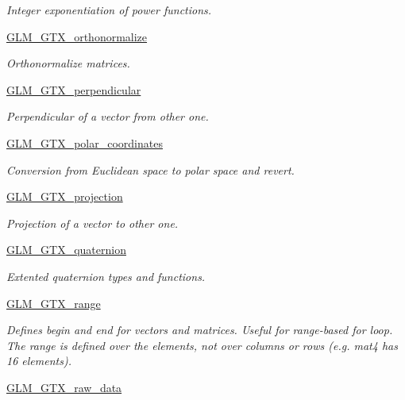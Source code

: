\begin{DoxyCompactItemize}
\begin{DoxyCompactList}\small\item\em Integer exponentiation of power functions. \end{DoxyCompactList}\item 
\mbox{\hyperlink{group__gtx__orthonormalize}{G\+L\+M\+\_\+\+G\+T\+X\+\_\+orthonormalize}}
\begin{DoxyCompactList}\small\item\em Orthonormalize matrices. \end{DoxyCompactList}\item 
\mbox{\hyperlink{group__gtx__perpendicular}{G\+L\+M\+\_\+\+G\+T\+X\+\_\+perpendicular}}
\begin{DoxyCompactList}\small\item\em Perpendicular of a vector from other one. \end{DoxyCompactList}\item 
\mbox{\hyperlink{group__gtx__polar__coordinates}{G\+L\+M\+\_\+\+G\+T\+X\+\_\+polar\+\_\+coordinates}}
\begin{DoxyCompactList}\small\item\em Conversion from Euclidean space to polar space and revert. \end{DoxyCompactList}\item 
\mbox{\hyperlink{group__gtx__projection}{G\+L\+M\+\_\+\+G\+T\+X\+\_\+projection}}
\begin{DoxyCompactList}\small\item\em Projection of a vector to other one. \end{DoxyCompactList}\item 
\mbox{\hyperlink{group__gtx__quaternion}{G\+L\+M\+\_\+\+G\+T\+X\+\_\+quaternion}}
\begin{DoxyCompactList}\small\item\em Extented quaternion types and functions. \end{DoxyCompactList}\item 
\mbox{\hyperlink{group__gtx__range}{G\+L\+M\+\_\+\+G\+T\+X\+\_\+range}}
\begin{DoxyCompactList}\small\item\em Defines begin and end for vectors and matrices. Useful for range-\/based for loop. The range is defined over the elements, not over columns or rows (e.\+g. mat4 has 16 elements). \end{DoxyCompactList}\item 
\mbox{\hyperlink{group__gtx__raw__data}{G\+L\+M\+\_\+\+G\+T\+X\+\_\+raw\+\_\+data}}

\end{DoxyCompactItemize}
